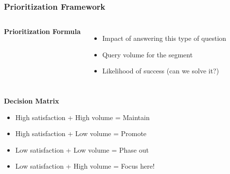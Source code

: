 \begin{frame}
    \frametitle{Prioritization Framework}
    
    \begin{columns}
        \textbf{Prioritization Formula}
        \begin{itemize}
            \item Impact of answering this type of question
            \item Query volume for the segment
            \item Likelihood of success (can we solve it?)
        \end{itemize}
        
        \begin{center}
        \end{center}
    \end{columns}
    
    \vspace{0.3cm}
    \textbf{Decision Matrix}
    \begin{itemize}
        \item High satisfaction + High volume = Maintain
        \item High satisfaction + Low volume = Promote
        \item Low satisfaction + Low volume = Phase out
        \item Low satisfaction + High volume = Focus here!
    \end{itemize}
\end{frame}

